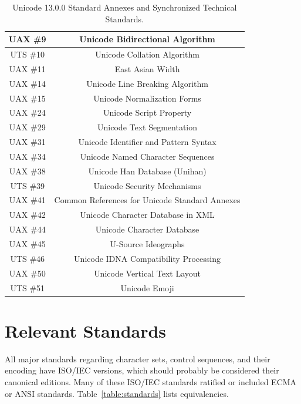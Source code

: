 \documentclass[letterpaper,10pt]{article}
\begin{document}
\begin{appendices}
\begin{table}[h]
\begin{center}
  \begin{tabular}{ |c|c| }
    \hline
    UAX \#9 & Unicode Bidirectional Algorithm \\
    \hline
    UTS \#10 & Unicode Collation Algorithm \\
    \hline
    UAX \#11 & East Asian Width \\
    \hline
    UAX \#14 & Unicode Line Breaking Algorithm \\
    \hline
    UAX \#15 & Unicode Normalization Forms \\
    \hline
    UAX \#24 & Unicode Script Property \\
    \hline
    UAX \#29 & Unicode Text Segmentation \\
    \hline
    UAX \#31 & Unicode Identifier and Pattern Syntax \\
    \hline
    UAX \#34 & Unicode Named Character Sequences \\
    \hline
    UAX \#38 & Unicode Han Database (Unihan) \\
    \hline
    UTS \#39 & Unicode Security Mechanisms \\
    \hline
    UAX \#41 & Common References for Unicode Standard Annexes \\
    \hline
    UAX \#42 & Unicode Character Database in XML \\
    \hline
    UAX \#44 & Unicode Character Database \\
    \hline
    UAX \#45 & U-Source Ideographs \\
    \hline
    UTS \#46 & Unicode IDNA Compatibility Processing \\
    \hline
    UAX \#50 & Unicode Vertical Text Layout \\
    \hline
    UTS \#51 & Unicode Emoji \\
    \hline
  \end{tabular}
\caption{Unicode 13.0.0 Standard Annexes and Synchronized Technical Standards.}
\end{center}
\end{table}

\cleardoublepage
\section{Relevant Standards}
All major standards regarding character sets, control sequences, and their
encoding have ISO/IEC versions, which should probably be considered their
canonical editions. Many of these ISO/IEC standards ratified or included ECMA
or ANSI standards. Table~\ref{table:standards} lists equivalencies.


\end{appendices}
\end{document}
